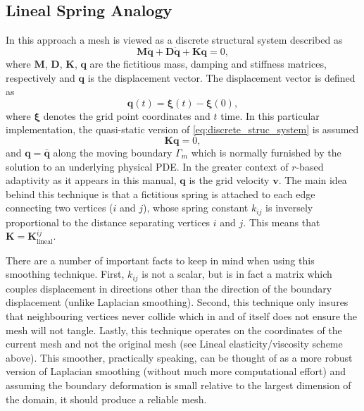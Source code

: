 \subsection{Lineal Spring Analogy}
In this approach \citep{farhat1998} a mesh is viewed as a discrete structural system described as
\begin{equation}
\label{eq:discrete_struc_system}
\bm{M}\ddot{\bm{q}} + \bm{D}\dot{\bm{q}} + \bm{K}\bm{q} = 0,
\end{equation}
where $\bm{M}$, $\bm{D}$, $\bm{K}$, $\bm{q}$ are the fictitious mass, damping and stiffness matrices, respectively and $\bm{q}$ is the displacement vector.  The displacement vector is defined as
\begin{equation}
\bm{q}\left(t\right) = \bm{\xi}\left(t\right) - \bm{\xi}\left(0\right),
\end{equation}
where $\bm{\xi}$ denotes the grid point coordinates and $t$ time.  In this particular implementation, the quasi-static version of \ref{eq:discrete_struc_system} is assumed 
\begin{equation}
\label{eq:static_version}
\bm{K}\bm{q}=0,
\end{equation}
and $\bm{q}=\bar{\bm{q}}$ along the moving boundary $\Gamma_{m}$ which is normally furnished by the solution to an underlying physical PDE.  In the greater context of $r$-based adaptivity as it appears in this manual, $\bm{q}$ is the grid velocity $\bm{v}$.   The main idea behind this technique is that a fictitious spring is attached to each edge connecting two vertices ($i$ and $j$), whose spring constant $k_{ij}$ is inversely proportional to the distance separating vertices $i$ and $j$.  This means that $\bm{K} = \bm{K}^{ij}_{\textrm{lineal}}$.  

There are a number of important facts to keep in mind when using this smoothing technique.  First,  $k_{ij}$ is not a scalar, but is in fact a matrix which couples displacement in directions other than the direction of the boundary displacement (unlike Laplacian smoothing).  Second, this technique only insures that neighbouring vertices never collide which in and of itself does not ensure the mesh will not tangle.  Lastly, this technique operates on the coordinates of the current mesh and not the original mesh (see Lineal elasticity/viscosity scheme above).  This smoother, practically speaking, can be thought of as a more robust version of Laplacian smoothing (without much more computational effort) and assuming the boundary deformation is small relative to the largest dimension of the domain, it should produce a reliable mesh.

